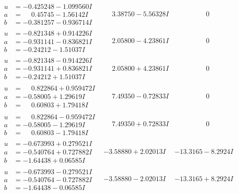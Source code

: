 \documentclass[1p]{elsarticle_modified}
\theoremstyle{definition}
\begin{document}
$$\begin{array}{c|c|c}
\begin{aligned}
u &= -0.425248 - 1.099560 I \\
a &= \phantom{-}0.45745 - 1.56142 I \\
b &= -0.381257 - 0.936714 I\end{aligned}
 & \phantom{-}3.38750 - 5.56328 I & \phantom{-0.000000 } 0 \\ \hline\begin{aligned}
u &= -0.821348 + 0.914226 I \\
a &= -0.931141 - 0.836821 I \\
b &= -0.24212 - 1.51037 I\end{aligned}
 & \phantom{-}2.05800 - 4.23861 I & \phantom{-0.000000 } 0 \\ \hline\begin{aligned}
u &= -0.821348 - 0.914226 I \\
a &= -0.931141 + 0.836821 I \\
b &= -0.24212 + 1.51037 I\end{aligned}
 & \phantom{-}2.05800 + 4.23861 I & \phantom{-0.000000 } 0 \\ \hline\begin{aligned}
u &= \phantom{-}0.822864 + 0.959472 I \\
a &= -0.58005 + 1.29619 I \\
b &= \phantom{-}0.60803 + 1.79418 I\end{aligned}
 & \phantom{-}7.49350 - 0.72833 I & \phantom{-0.000000 } 0 \\ \hline\begin{aligned}
u &= \phantom{-}0.822864 - 0.959472 I \\
a &= -0.58005 - 1.29619 I \\
b &= \phantom{-}0.60803 - 1.79418 I\end{aligned}
 & \phantom{-}7.49350 + 0.72833 I & \phantom{-0.000000 } 0 \\ \hline\begin{aligned}
u &= -0.673993 + 0.279521 I \\
a &= -0.540764 + 0.727882 I \\
b &= -1.64438 + 0.06585 I\end{aligned}
 & -3.58880 + 2.02013 I & -13.3165 - 8.2924 I \\ \hline\begin{aligned}
u &= -0.673993 - 0.279521 I \\
a &= -0.540764 - 0.727882 I \\
b &= -1.64438 - 0.06585 I\end{aligned}
 & -3.58880 - 2.02013 I & -13.3165 + 8.2924 I \\ \hline\begin{aligned}

\end{aligned}
\end{array}$$
\end{document}
